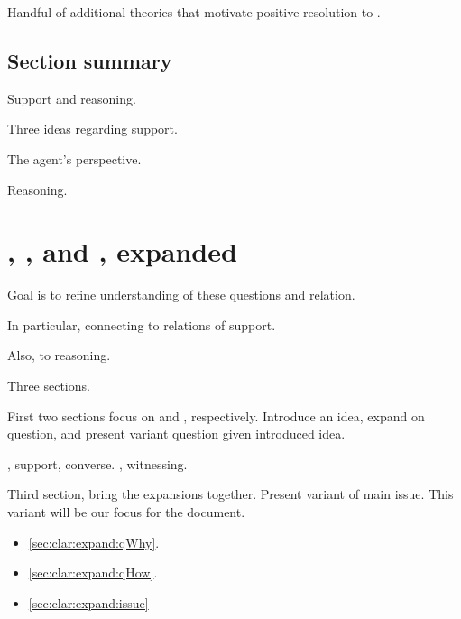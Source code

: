 \begin{note}[Motivation]
  Handful of additional theories that motivate positive resolution to \issueInclusion{}.
\end{note}

\subsection{Section summary}
\label{sec:section-summary}

\begin{note}
  Support and reasoning.

  Three ideas regarding support.

  The agent's perspective.

  Reasoning.
\end{note}

\section{\qWhy{}, \qHow{}, and \issueInclusion{}, expanded}
\label{sec:support-why-how}

\begin{note}[Goal]
  Goal is to refine understanding of these questions and relation.

  In particular, connecting \qWhy{} to relations of support.

  Also, \qHow{} to reasoning.
\end{note}

\begin{note}[Division]
  Three sections.

  First two sections focus on \qWhy{} and \qHow{}, respectively.
  Introduce an idea, expand on question, and present variant question given introduced idea.

  \qWhy{}, support, converse.
  \qHow{}, witnessing.

  Third section, bring the expansions together.
  Present variant of main issue.
  This variant will be our focus for the document.

  \begin{itemize}
  \item
    \autoref{sec:clar:expand:qWhy}.
  \item
    \autoref{sec:clar:expand:qHow}.
  \item
    \autoref{sec:clar:expand:issue}
  \end{itemize}
\end{note}

\subsection{\qWhy{}}
\label{sec:clar:expand:qWhy}

